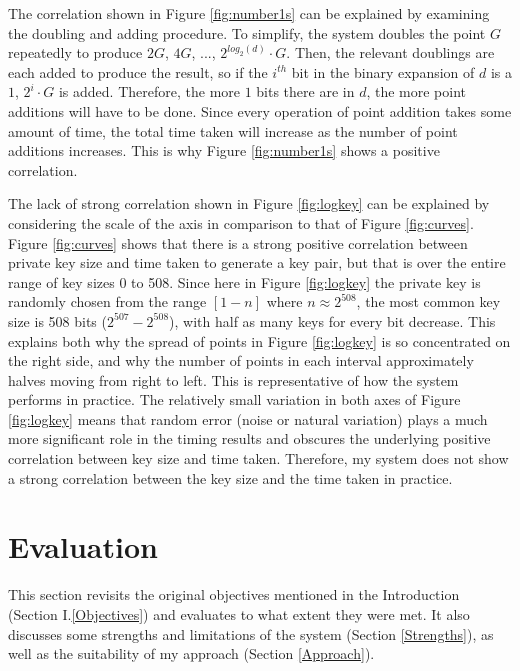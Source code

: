 \documentclass[12pt,a4paper]{article}
\begin{document}
The correlation shown in Figure \ref{fig:number1s} can be explained by examining the doubling and adding procedure. 
To simplify, the system doubles the point $G$ repeatedly to produce $2G$, $4G$, ..., $2^{log_2(d)} \cdot G$. 
Then, the relevant doublings are each added to produce the result, 
so if the $i^{th}$ bit in the binary expansion of $d$ is a $1$, $2^i \cdot G$ is added. 
Therefore, the more $1$ bits there are in $d$, the more point additions will have to be done. 
Since every operation of point addition takes some amount of time, the total time taken will increase as the number of point additions increases. 
This is why Figure \ref{fig:number1s} shows a positive correlation. 

\vspace{3mm}

The lack of strong correlation shown in Figure \ref{fig:logkey} can be explained by considering the scale of the axis in comparison to that of 
Figure \ref{fig:curves}. 
Figure \ref{fig:curves} shows that there is a strong positive correlation between private key size and time taken to generate a key pair, 
but that is over the entire range of key sizes 0 to 508. 
Since here in Figure \ref{fig:logkey} the private key is randomly chosen from the range $[1-n]$ where $n \approx 2^{508}$, 
the most common key size is 508 bits ($2^{507}-2^{508}$), with half as many keys for every bit decrease. 
This explains both why the spread of points in Figure \ref{fig:logkey} is so concentrated on the right side, 
and why the number of points in each interval approximately halves moving from right to left. 
This is representative of how the system performs in practice. 
The relatively small variation in both axes of Figure \ref{fig:logkey} means that random error (noise or natural variation) 
plays a much more significant role in the timing results and obscures the underlying positive correlation between key size and time taken. 
Therefore, my system does not show a strong correlation between the key size and the time taken in practice. 



\section{Evaluation} \noindent
This section revisits the original objectives mentioned in the Introduction (Section I.\ref{Objectives}) and evaluates to what extent they were met. 
It also discusses some strengths and limitations of the system (Section \ref{Strengths}), as well as the suitability of my approach (Section \ref{Approach}). 
\end{document}
